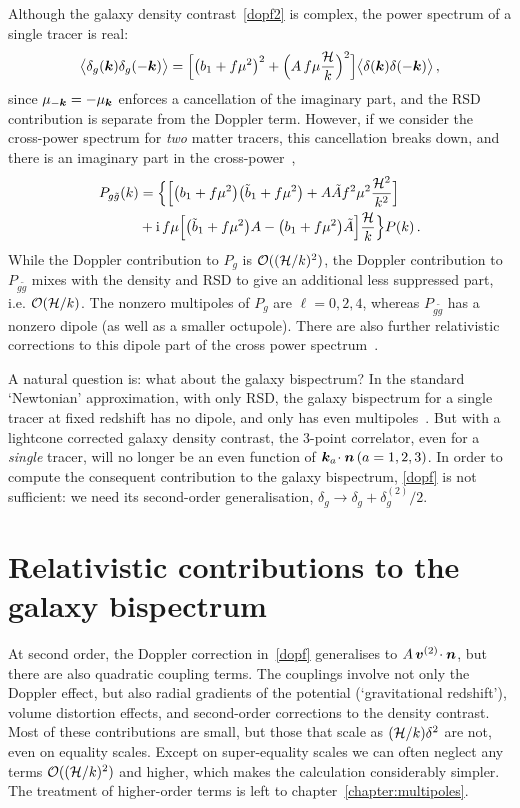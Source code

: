 Although the galaxy density contrast~\eqref{dopf2} is complex, the power spectrum of a single tracer is real:
\begin{equation}
\big\langle \delta_g(\bm {k})\delta_g(-\bm {k})\big\rangle
=\Big[ \big(b_{1} + f\mu^{2}\big)^2+\Big(A\,f \mu \frac{\mathcal{H}}{k}\Big)^2\Big] \big\langle \delta(\bm {k})\delta(-\bm {k})\big\rangle \,,\nonumber
\end{equation}
since $\mu_{-\bm {k}}=-\mu_{\bm {k}}$ enforces a cancellation of the imaginary part, and the RSD contribution is separate from the Doppler term.
However, if we consider the cross-power spectrum for {\em two} matter tracers, this cancellation breaks down, and  there is an imaginary part in the cross-power~\citep{McDonald:2009dh,Bonvin:2014owa},
\begin{align}
P_{g \tilde g}(k)&= \Big\{\Big[ \big(b_{1} + f\mu^{2}\big)\big(\tilde b_{1} + f\mu^{2}\big)+A\tilde A f^2\mu^2 {\frac{\mathcal{H}^2}{k^2}}\Big]\nonumber\\
&
+\mathrm{i\,} f\mu\Big[\big(\tilde b_{1} + f\mu^{2}\big)A-\big(b_{1} + f\mu^{2}\big)\tilde A\Big]{\frac{\mathcal{H}}{k}} \Big\}P(k) \,.\nonumber
\end{align}
While the Doppler contribution to $P_g$ is $\mathcal{O}((\mathcal{H}/k)^{2})$,  the Doppler contribution to $P_{g\tilde g}$ mixes with the density and RSD to give an additional less suppressed part, i.e. $\mathcal{O}(\mathcal{H}/k)$. The nonzero multipoles of $P_g$ are $\ell=0,2,4$, whereas  $P_{g \tilde g}$ has a nonzero dipole (as well as a smaller octupole).  There are also further relativistic corrections to this dipole part of the cross power spectrum~\citep{DiDio:2018zmk}.


A natural question is: what about the galaxy bispectrum? In the standard `Newtonian' approximation, with only RSD, the galaxy bispectrum for a single tracer at fixed redshift has no dipole, and only has even multipoles~\citep{Scoccimarro:1999ed,Nan:2017oaq}. But
with a lightcone corrected galaxy density contrast, the 3-point correlator, even for a {\em single} tracer, will no longer be an even function of $\bm {k}_a\!\cdot\bm {n} \,(a=1,2,3)$. In order to compute the consequent contribution to the galaxy bispectrum, \eqref{dopf} is not sufficient: we need its second-order generalisation, $\delta_g \to \delta_g+\delta^{(2)}_g/2$.

\section{Relativistic contributions to the galaxy bispectrum}

At second order, the Doppler correction in~\eqref{dopf} generalises to $A\, \bm{v}^{(2)}\!\cdot\bm {n}$, but there are also quadratic coupling terms. The couplings involve not only the Doppler effect, but also radial gradients of the potential (`gravitational redshift'), volume distortion effects, and second-order corrections to the density contrast. Most of these contributions are small, but those that scale as $(\mathcal{H}/k)\delta^2$ are not, even on equality scales. Except on super-equality scales we can often neglect any terms $\mathcal{O}((\mathcal{H}/k)^{2})$ and higher, which makes the calculation considerably simpler. The treatment of higher-order terms is left to chapter~\ref{chapter:multipoles}.


